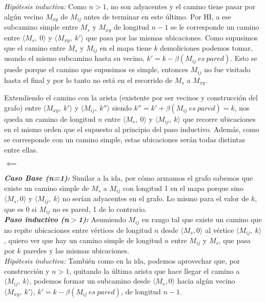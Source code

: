     \emph{Hipótesis inductiva: } Como $n>1$, no son adyacentes y el camino tiene pasar por algún vecino $M_{xy}$ de $M_{ij}$ antes de terminar en este último. Por HI, a ese subcamino simple entre $M_s$ y $M_{xy}$ de longitud $n-1$ se le corresponde un camino entre $\langle {M_s,\ 0} \rangle$ y $\langle {M_{xy},\ k'} \rangle$ que pasa por las mismas ubicaciones. Como supusimos que el camino entre $M_s$ y $M_{ij}$ en el mapa tiene $k$ demoliciones podemos tomar, usando el mismo subcamino hasta su vecino, $k' = k - \beta(M_{ij}\ es\ pared)$. Esto se puede porque el camino que supusimos es simple, entonces $M_{ij}$ no fue visitado hasta el final y por lo tanto no está en el recorrido de $M_s$ a $M_{xy}$.

    Extendiendo el camino con la arista (existente por ser vecinos y construcción del grafo) entre $\langle M_{xy},\ k' \rangle$ y $\langle M_{ij},\ k''\rangle$ siendo $k'' = k' + \beta(M_{ij}\ es\ pared) = k$, nos queda un camino de longitud $n$ entre $\langle {M_s,\ 0} \rangle$ y $\langle {M_{ij},\ k} \rangle$ que recorre ubicaciones en el mismo orden que el supuesto al principio del paso inductivo. Además, como se corresponde con un camino simple, estas ubicaciones serán todas distintas entre ellas.
    \\

    \begin{center}$\mathbf{\impliedby}$\end{center}

    \textbf{\emph{Caso Base (n=1): }} Similar a la ida, por cómo armamos el grafo sabemos que existe un camino simple de $M_s$ a $M_{ij}$ con longitud 1 en el mapa porque sino $\langle {M_s, 0} \rangle$ y $\langle {M_{ij},\ k} \rangle$ no serían adyacentes en el grafo. Lo mismo para el valor de $k$, que es 0 si $M_{ij}$ no es pared, 1 de lo contrario.
    \\

    \textbf{\emph{Paso inductivo (n$>$1): }} Asumiendo $M_{ij}$ en rango tal que existe un camino que no repite ubicaciones entre vértices de longitud $n$ desde $\langle {M_s, 0} \rangle$ al vértice $\langle {M_{ij},\ k} \rangle$, quiero ver que hay un camino simple de longitud $n$ entre $M_{ij}$ y $M_s$, que pasa por $k$ paredes y las mismas ubicaciones.
    \\

    \emph{Hipótesis inductiva: } También como en la ida, podemos aprovechar que, por construcción y $n>1$, quitando la última arista que hace llegar el camino a $\langle {M_{ij},\ k} \rangle$, podemos formar un subcamino desde $\langle {M_s, 0} \rangle$ hacia algún vecino $\langle {M_{xy},\ k' } \rangle$,  $k'= k-\beta(M_{ij}\ es\ pared)$, de longitud $n-1$.

